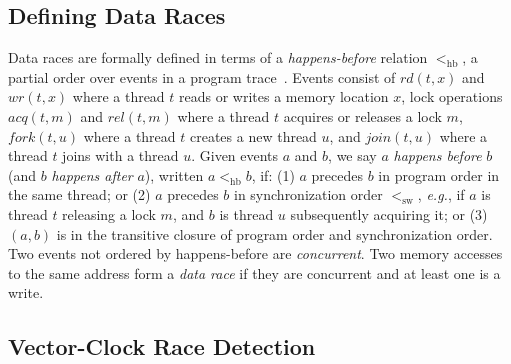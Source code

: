\documentclass[preprint, 10pt]{sigplanconf}
\newcommand{\eg}{\textit{e.g.}\xspace}
\newcommand{\hb}[0]{<_{\mathrm{hb}}}
\newcommand{\sw}[0]{<_{\mathrm{sw}}}
\newcommand{\Tid}{t}
\newcommand{\TidU}{u}
\newcommand{\Lock}{m}
\begin{document}

\subsection{Defining Data Races}
Data races are formally defined in terms of a \emph{happens-before} relation $\hb$, a partial order over events in a program trace~\cite{lamporthb}. Events consist of $\mathit{rd}(t, x)$ and $\mathit{wr}(t, x)$ where a thread $t$ reads or writes a memory location $x$, lock operations $\mathit{acq}(t, m)$ and $\mathit{rel}(t, m)$ where a thread $t$ acquires or releases a lock $m$, $\mathit{fork}(t, u)$ where a thread $t$ creates a new thread $u$, and $\mathit{join}(t, u)$ where a thread $t$ joins with a thread $u$. Given events $a$ and $b$, we say $a$ \emph{happens before} $b$ (and $b$ \emph{happens after} $a$), written $a \hb b$, if: (1) $a$ precedes $b$ in program order in the same thread; or (2) $a$ precedes $b$ in synchronization order $\sw$, \eg, if $a$ is thread $\Tid$ releasing a lock $\Lock$, and $b$ is thread $\TidU$ subsequently acquiring it; or (3) $(a,b)$ is in the transitive closure of program order and synchronization order.
Two events not ordered by happens-before are \emph{concurrent}.  Two memory accesses to the same address form a \emph{data race} if they are concurrent and at least one is a write.

\subsection{Vector-Clock Race Detection}
\label{vector-clocks}


\newcommand{\bigcell}[2][c]{%
  \begin{tabular}[#1]{@{}c@{}}#2\end{tabular}}
\end{document}
